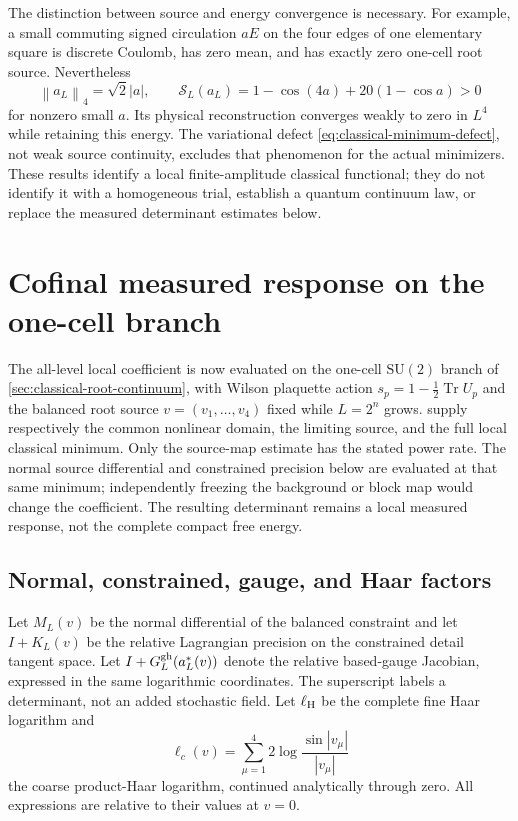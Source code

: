 \documentclass[11pt,oneside,openany]{book}
\theoremstyle{definition}
\theoremstyle{remark}
\newcommand{\Tr}{\operatorname{Tr}}
\newcommand{\SU}{\mathrm{SU}}
\newcommand{\norm}[1]{\left\lVert#1\right\rVert}
\newcommand{\src}[2]{\cite[#2]{#1}}
\begin{document}
The distinction between source and energy convergence is necessary.
For example, a small commuting signed circulation $aE$ on the four
edges of one elementary square is discrete Coulomb, has zero mean,
and has exactly zero one-cell root source. Nevertheless
\[
 \norm{a_L}_4=\sqrt2|a|,\qquad
 \mathcal S_L(a_L)=1-\cos(4a)+20(1-\cos a)>0
\]
for nonzero small $a$. Its physical reconstruction converges weakly
to zero in $L^4$ while retaining this energy. The variational defect
\cref{eq:classical-minimum-defect}, not weak source continuity,
excludes that phenomenon for the actual minimizers. These results
identify a local finite-amplitude classical functional; they do not
identify it with a homogeneous trial, establish a quantum continuum
law, or replace the measured determinant estimates below.
\src{SM}{V11--V13}

\section{Cofinal measured response on the one-cell branch}
\label{sec:cofinal-measured-response}
The all-level local coefficient is now evaluated on the one-cell
$\SU(2)$ branch of \cref{sec:classical-root-continuum}, with Wilson
plaquette action $s_p=1-\tfrac12\Tr U_p$ and the balanced root source
$v=(v_1,\ldots,v_4)$ fixed while $L=2^n$ grows.
supply respectively the common nonlinear domain, the limiting source,
and the full local classical minimum. Only the source-map estimate has
the stated power rate. The normal source differential and constrained
precision below are evaluated at that same minimum; independently
freezing the background or block map would change the coefficient.
The resulting determinant remains a local measured response, not the
complete compact free energy.

\subsection{Normal, constrained, gauge, and Haar factors}
Let $M_L(v)$ be the normal differential of the balanced constraint and
let $I+K_L(v)$ be the relative Lagrangian precision on the constrained
detail tangent space. Let $I+G_L^{\rm gh}(a_L^*(v))$ denote the relative
based-gauge Jacobian, expressed in the same logarithmic coordinates.
The superscript labels a determinant, not an added stochastic field.
Let $\ell_{\rm H}$ be the complete fine Haar logarithm and
\[
 \ell_c(v)=\sum_{\mu=1}^4 2\log\frac{\sin|v_\mu|}{|v_\mu|}
\]
the coarse product-Haar logarithm, continued analytically through zero.
All expressions are relative to their values at $v=0$.
\end{document}
